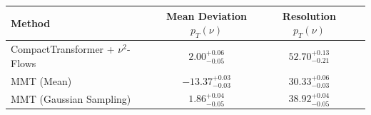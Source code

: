     \begin{tabular}{lccc}
        \toprule
        Method & Mean Deviation $p_{T}({\nu})$ & Resolution $p_{T}({\nu})$ \\
        \midrule
        CompactTransformer + $\nu^2$-Flows & $2.00^{+0.06}_{-0.05}$ & $52.70^{+0.13}_{-0.21}$ \\
        MMT (Mean) & $-13.37^{+0.03}_{-0.03}$ & $30.33^{+0.06}_{-0.03}$ \\
        MMT (Gaussian Sampling) & $1.86^{+0.04}_{-0.05}$ & $38.92^{+0.04}_{-0.05}$ \\
        \bottomrule
    \end{tabular}